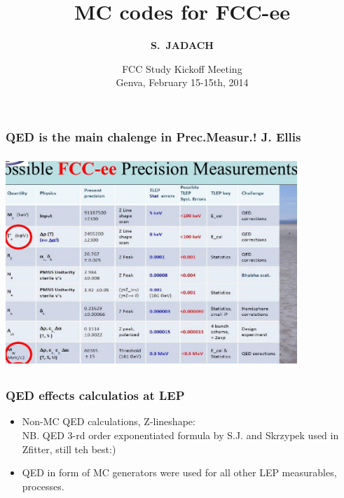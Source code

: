\documentclass{beamer}
\title[Monte Carlo Methods] %
{ {\bf MC codes for FCC-ee}
} %
\author[S.~Jadach] %
{\Large\bf S.~JADACH }
\institute[Universities of Somewhere and Elsewhere] %
{ {\large\crd IFJ-PAN, Krak\'ow, Poland}\\
  {~~~}\\
  {\footnotesize
  Partly supported by Polish Government grant\\
  {\em Narodowe Centrum Nauki} DEC-2011/03/B/ST2/02632
}}
\date[Short Occasion] %
{\small FCC Study Kickoff Meeting\\
   Genva,
   February 15-15th, 2014
}
\newcommand{\cbl}{\color{blue}}
\newcommand{\ns}{\normalsize}
\begin{document}
\begin{frame}
  \titlepage
\end{frame}


\begin{frame}[fragile]
\frametitle{\bf QED is the main chalenge in Prec.Measur.! J. Ellis}

\vspace{-2mm}
{\includegraphics[width=110mm,height=80mm]{JEllis.jpg}}

\end{frame}

\begin{frame}[fragile]
\frametitle{\bf QED effects calculatios at LEP}
\Large\bf
\begin{itemize}
\item
{\cbl Non-MC QED calculations}, Z-lineshape:\\
{\ns 
NB. QED 3-rd order exponentiated formula
by S.J. and Skrzypek used in Zfitter, still teh best:)}
\item
QED in form of {\cbl MC generators}
were used for all other LEP
measurables, processes.
\end{itemize}

\end{frame}
\end{document}
